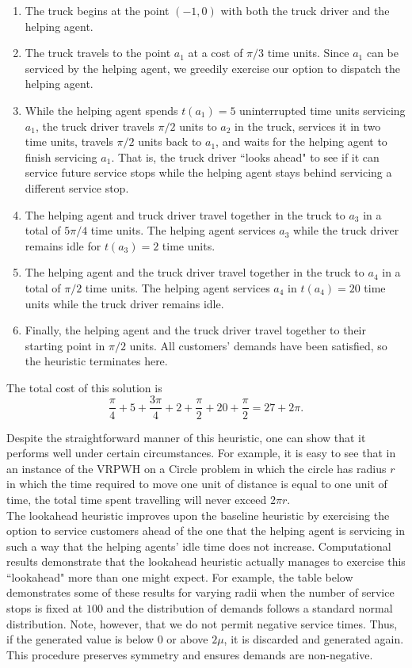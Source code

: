 \documentclass[12pt]{scrartcl}
\begin{document}
\begin{enumerate}
    \item The truck begins at the point $(-1, 0)$ with both the truck driver and the helping agent. 
    \item The truck travels to the point $a_1$ at a cost of $\pi/3$ time units. Since $a_1$ can be serviced by the helping agent, we greedily exercise our option to dispatch the helping agent. 
    \item While the helping agent spends $t(a_1) = 5$ uninterrupted time units servicing $a_1$, the truck driver travels $\pi/2$ units to $a_2$ in the truck, services it in two time units, travels $\pi/2$ units back to $a_1$, and waits for the helping agent to finish servicing $a_1$. That is, the truck driver ``looks ahead" to see if it can service future service stops while the helping agent stays behind servicing a different service stop. 
    \item The helping agent and truck driver travel together in the truck to $a_3$ in a total of $5\pi/4$ time units. The helping agent services $a_3$ while the truck driver remains idle for $t(a_3) = 2$ time units. 
    \item The helping agent and the truck driver travel together in the truck to $a_4$ in a total of $\pi/2$ time units. The helping agent services $a_4$ in $t(a_4) = 20$ time units while the truck driver remains idle. 
    \item Finally, the helping agent and the truck driver travel together to their starting point in $\pi/2$ units. All customers' demands have been satisfied, so the heuristic terminates here.
\end{enumerate}

\noindent The total cost of this solution is 
\[
\frac{\pi}{4} + 5 + \frac{3\pi}{4} + 2 + \frac{\pi}{2} + 20 + \frac{\pi}{2} = 27 + 2\pi. 
\]

Despite the straightforward manner of this heuristic, one can show that it performs well under certain circumstances. For example, it is easy to see that in an instance of the VRPWH on a Circle problem in which the circle has radius $r$ in which the time required to move one unit of distance is equal to one unit of time, the total time spent travelling will never exceed $2\pi r$. \\

The lookahead   heuristic improves upon the baseline heuristic by exercising the option to service customers ahead of the one that the helping agent is servicing in such a way that the helping agents' idle time does not increase. Computational results demonstrate that the lookahead heuristic actually manages to exercise this ``lookahead" more than one might expect. For example, the table below demonstrates some of these results for varying radii when the number of service stops is fixed at $100$ and the distribution of demands follows a standard normal distribution. Note, however, that we do not permit negative service times. Thus, if the generated value is below $0$ or above $2\mu$, it is discarded and generated again. This procedure preserves symmetry and ensures demands are non-negative. \\
\end{document}
